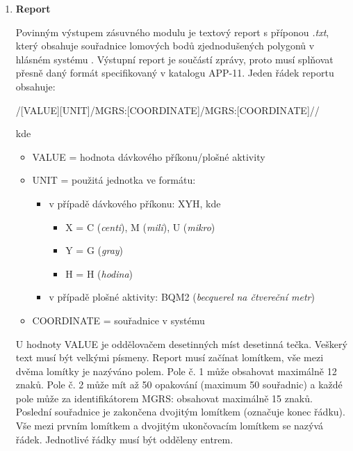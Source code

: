 \begin{enumerate}
	\item \textbf{Report}

Povinným výstupem zásuvného modulu je textový report s příponou \textit{.txt}, který obsahuje souřadnice lomových bodů zjednodušených polygonů v hlásném systému . Výstupní report je součástí  zprávy, proto musí splňovat přesně daný formát specifikovaný v katalogu APP-11. Jeden řádek reportu obsahuje:

/[VALUE][UNIT]/MGRS:[COORDINATE]/MGRS:[COORDINATE]//

kde
\begin{itemize}
			\item VALUE = hodnota dávkového příkonu/plošné aktivity 
			
			\item UNIT = použitá jednotka ve formátu:
			
			\begin{itemize}
				\item v případě dávkového příkonu: XYH, kde
			 		\begin{itemize}
						\item X = C (\textit{centi}), M (\textit{mili}), U (\textit{mikro})
						\item Y = G (\textit{gray})
						\item H = H (\textit{hodina})
					\end{itemize}
				\item v případě plošné aktivity: BQM2 (\textit{becquerel na čtvereční metr})
			\end{itemize}
			
			\item COORDINATE = souřadnice v systému 
\end{itemize}
				
U hodnoty VALUE je oddělovačem desetinných míst desetinná tečka. Veškerý text musí být velkými písmeny. Report musí začínat lomítkem, vše mezi dvěma lomítky je nazýváno polem. Pole č. 1 může obsahovat maximálně 12 znaků. Pole č. 2 může mít až 50 opakování (maximum 50 souřadnic) a každé pole může za identifikátorem MGRS: obsahovat maximálně 15 znaků. Poslední souřadnice je zakončena dvojitým lomítkem (označuje konec řádku). Vše mezi prvním lomítkem a dvojitým ukončovacím lomítkem se nazývá řádek. Jednotlivé řádky musí být odděleny entrem.	


\end{enumerate}
